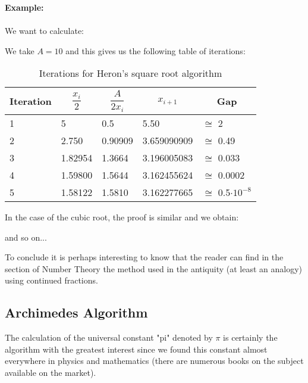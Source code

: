 		\begin{tcolorbox}[colframe=black,colback=white,sharp corners]
\textbf{{\Large {}}Example:}\\\\
We want to calculate:
	
	We take $A=10$ and this gives us the following table of iterations:
	
		\begin{table}[H]
	\begin{center}
			\begin{tabular}{|p{1cm}|p{2cm}|p{1.8cm}|p{2.5cm}|p{2cm}|}
				\hline
				\multicolumn{1}{c}{\cellcolor{black!30}\textbf{Iteration}} & 
\multicolumn{1}{c}{\cellcolor{black!30}\textbf{$\dfrac{x_i}{2}$}} & \multicolumn{1}{c}{\cellcolor{black!30}\textbf{$\dfrac{A}{2x_i}$}} & \multicolumn{1}{c}{\cellcolor{black!30}\textbf{$x_{i+1}$}} & \multicolumn{1}{c}{\cellcolor{black!30}\textbf{Gap}}\\ \hline
		1 & 5 & 0.5 & 5.50 & $\cong$ 2 \\ \hline
		2 & 2.750 & 0.90909 & 3.659090909 & $\cong$ 0.49 \\ \hline
		3 & 1.82954 & 1.3664 & 3.196005083 & $\cong$ 0.033 \\ \hline
		4 & 1.59800 & 1.5644 & 3.162455624  & $\cong$ 0.0002 \\ \hline
		5 & 1.58122 & 1.5810 & 3.162277665 & $\cong$ 0.5$\cdot 10^{-8}$ \\ \hline
	\end{tabular}
	\end{center}
	\caption[]{Iterations for Heron's square root algorithm}
	\end{table}	
	\end{tcolorbox}

	In the case of the cubic root, the proof is similar and we obtain:
	
	
	and so on...
	
	To conclude it is perhaps interesting to know that the reader can find in the section of Number Theory the method used in the antiquity (at least an analogy) using continued fractions.
	
		\pagebreak
		\subsection{Archimedes Algorithm}
	
	The calculation of the universal constant "pi" denoted by $\pi$ is certainly the algorithm with the greatest interest since we found this constant almost everywhere in physics and mathematics (there are numerous books on the subject available on the market).
	
